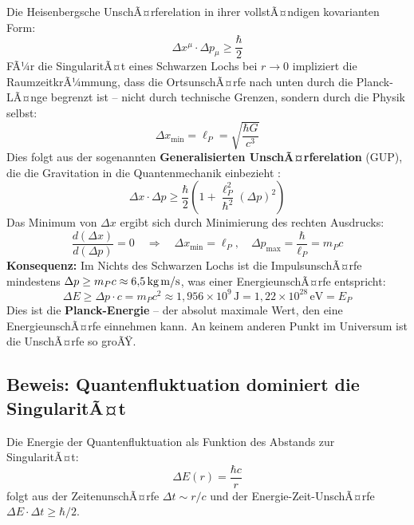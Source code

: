 ﻿\documentclass[12pt,a4paper]{report}
\begin{document}
Die Heisenbergsche UnschÃ¤rferelation in ihrer vollstÃ¤ndigen kovarianten Form:
\begin{equation}
    \Delta x^\mu \cdot \Delta p_\mu \geq \frac{\hbar}{2}
    \label{eq:unschaerfe_kovariant}
\end{equation}
FÃ¼r die SingularitÃ¤t eines Schwarzen Lochs bei $r \to 0$ impliziert die RaumzeitkrÃ¼mmung, dass die OrtsunschÃ¤rfe nach unten durch die Planck-LÃ¤nge begrenzt ist -- nicht durch technische Grenzen, sondern durch die Physik selbst:
\begin{equation}
    \Delta x_{\min} = \ell_P = \sqrt{\frac{\hbar G}{c^3}}
    \label{eq:min_ortsunschaerfe}
\end{equation}
Dies folgt aus der sogenannten \textbf{Generalisierten UnschÃ¤rferelation} (GUP), die die Gravitation in die Quantenmechanik einbezieht \cite{veneziano1986,maggiore1993}:
\begin{equation}
    \Delta x \cdot \Delta p \geq \frac{\hbar}{2}\left(1 + \frac{\ell_P^2}{\hbar^2}(\Delta p)^2\right)
    \label{eq:gup}
\end{equation}
Das Minimum von $\Delta x$ ergibt sich durch Minimierung des rechten Ausdrucks:
\begin{equation}
    \frac{d(\Delta x)}{d(\Delta p)} = 0 \quad \Longrightarrow \quad \Delta x_{\min} = \ell_P, \quad \Delta p_{\max} = \frac{\hbar}{\ell_P} = m_P c
    \label{eq:gup_minimum}
\end{equation}
\textbf{Konsequenz:} Im Nichts des Schwarzen Lochs ist die ImpulsunschÃ¤rfe mindestens $\Delta p \geq m_P c \approx 6{,}5\,\text{kg\,m/s}$, was einer EnergieunschÃ¤rfe entspricht:
\begin{equation}
    \Delta E \geq \Delta p \cdot c = m_P c^2 \approx 1{,}956 \times 10^9\,\text{J} = 1{,}22 \times 10^{28}\,\text{eV} = E_P
    \label{eq:planck_energie_unschaerfe}
\end{equation}
Dies ist die \textbf{Planck-Energie} -- der absolut maximale Wert, den eine EnergieunschÃ¤rfe einnehmen kann. An keinem anderen Punkt im Universum ist die UnschÃ¤rfe so groÃŸ.

\subsection{Beweis: Quantenfluktuation dominiert die SingularitÃ¤t}

Die Energie der Quantenfluktuation als Funktion des Abstands zur SingularitÃ¤t:
\begin{equation}
    \Delta E(r) = \frac{\hbar c}{r}
    \label{eq:energiefluktuation}
\end{equation}
folgt aus der ZeitenunschÃ¤rfe $\Delta t \sim r/c$ und der Energie-Zeit-UnschÃ¤rfe $\Delta E \cdot \Delta t \geq \hbar/2$.
\end{document}
